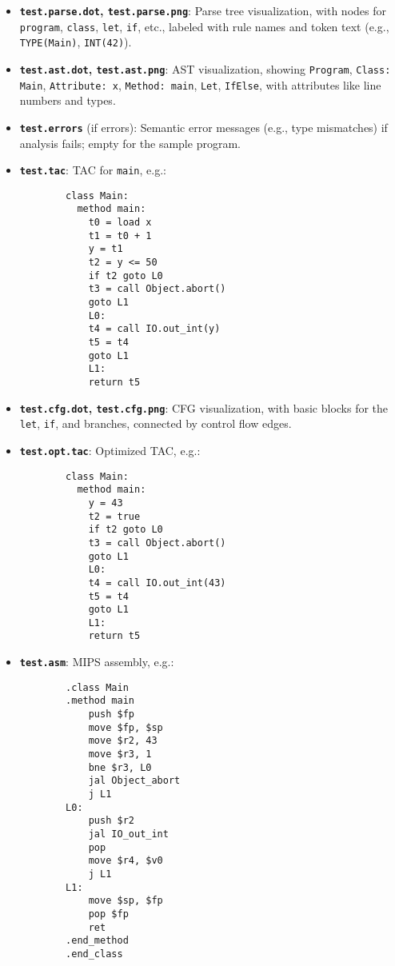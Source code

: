 \documentclass[11pt, titlepage]{article}
\begin{document}
\begin{itemize}[leftmargin=*]
    \item \textbf{\texttt{test.parse.dot}, \texttt{test.parse.png}}: Parse tree visualization, with nodes for \texttt{program}, \texttt{class}, \texttt{let}, \texttt{if}, etc., labeled with rule names and token text (e.g., \texttt{TYPE(Main)}, \texttt{INT(42)}).
    \item \textbf{\texttt{test.ast.dot}, \texttt{test.ast.png}}: AST visualization, showing \texttt{Program}, \texttt{Class: Main}, \texttt{Attribute: x}, \texttt{Method: main}, \texttt{Let}, \texttt{IfElse}, with attributes like line numbers and types.
    \item \textbf{\texttt{test.errors}} (if errors): Semantic error messages (e.g., type mismatches) if analysis fails; empty for the sample program.
    \item \textbf{\texttt{test.tac}}: TAC for \texttt{main}, e.g.:
        \begin{lstlisting}
        class Main:
          method main:
            t0 = load x
            t1 = t0 + 1
            y = t1
            t2 = y <= 50
            if t2 goto L0
            t3 = call Object.abort()
            goto L1
            L0:
            t4 = call IO.out_int(y)
            t5 = t4
            goto L1
            L1:
            return t5
        \end{lstlisting}
    \item \textbf{\texttt{test.cfg.dot}, \texttt{test.cfg.png}}: CFG visualization, with basic blocks for the \texttt{let}, \texttt{if}, and branches, connected by control flow edges.
    \item \textbf{\texttt{test.opt.tac}}: Optimized TAC, e.g.:
        \begin{lstlisting}
        class Main:
          method main:
            y = 43
            t2 = true
            if t2 goto L0
            t3 = call Object.abort()
            goto L1
            L0:
            t4 = call IO.out_int(43)
            t5 = t4
            goto L1
            L1:
            return t5
        \end{lstlisting}
    \item \textbf{\texttt{test.asm}}: MIPS assembly, e.g.:
        \begin{lstlisting}
        .class Main
        .method main
            push $fp
            move $fp, $sp
            move $r2, 43
            move $r3, 1
            bne $r3, L0
            jal Object_abort
            j L1
        L0:
            push $r2
            jal IO_out_int
            pop
            move $r4, $v0
            j L1
        L1:
            move $sp, $fp
            pop $fp
            ret
        .end_method
        .end_class
        \end{lstlisting}
\end{itemize}
\end{document}
